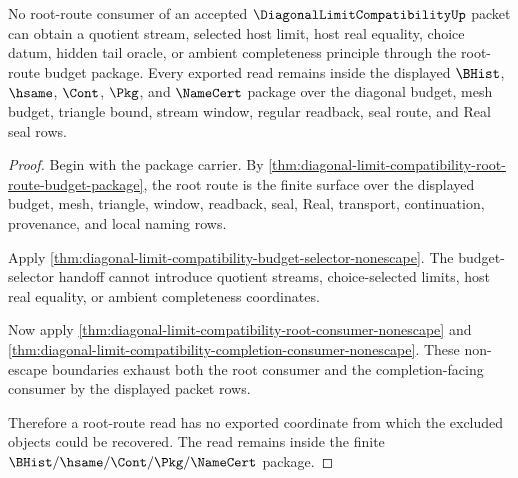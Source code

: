 \begin{theorem}
\label{thm:diagonal-limit-compatibility-root-route-nonescape}
No root-route consumer of an accepted $\DiagonalLimitCompatibilityUp$ packet can obtain a quotient stream, selected host limit, host real equality, choice datum, hidden tail oracle, or ambient completeness principle through the root-route budget package. Every exported read remains inside the displayed $\BHist$, $\hsame$, $\Cont$, $\Pkg$, and $\NameCert$ package over the diagonal budget, mesh budget, triangle bound, stream window, regular readback, seal route, and Real seal rows.
\end{theorem}
\begin{proof}
Begin with the package carrier. By \autoref{thm:diagonal-limit-compatibility-root-route-budget-package}, the root route is the finite surface over the displayed budget, mesh, triangle, window, readback, seal, Real, transport, continuation, provenance, and local naming rows.

Apply \autoref{thm:diagonal-limit-compatibility-budget-selector-nonescape}. The budget-selector handoff cannot introduce quotient streams, choice-selected limits, host real equality, or ambient completeness coordinates.

Now apply \autoref{thm:diagonal-limit-compatibility-root-consumer-nonescape} and \autoref{thm:diagonal-limit-compatibility-completion-consumer-nonescape}. These non-escape boundaries exhaust both the root consumer and the completion-facing consumer by the displayed packet rows.

Therefore a root-route read has no exported coordinate from which the excluded objects could be recovered. The read remains inside the finite $\BHist/\hsame/\Cont/\Pkg/\NameCert$ package.
\end{proof}

